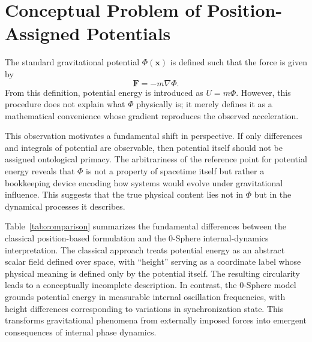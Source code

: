 \documentclass[%
 reprint,
 amsmath,amssymb,
 aps,
 prb,
]{revtex4-2}
\numberwithin{equation}{section}
\begin{document}
\section{Conceptual Problem of Position-Assigned Potentials}
\label{sec:conceptual_problem}

The standard gravitational potential $\Phi(\mathbf{x})$ is defined such that the force is given by
\begin{equation}
\mathbf{F} = - m \nabla \Phi.
\label{eq:force_potential}
\end{equation}
From this definition, potential energy is introduced as $U = m \Phi$. However, this procedure does not explain what $\Phi$ physically is; it merely defines it as a mathematical convenience whose gradient reproduces the observed acceleration.

This observation motivates a fundamental shift in perspective. If only differences and integrals of potential are observable, then potential itself should not be assigned ontological primacy. The arbitrariness of the reference point for potential energy reveals that $\Phi$ is not a property of spacetime itself but rather a bookkeeping device encoding how systems would evolve under gravitational influence. This suggests that the true physical content lies not in $\Phi$ but in the dynamical processes it describes.

Table~\ref{tab:comparison} summarizes the fundamental differences between the classical position-based formulation and the 0-Sphere internal-dynamics interpretation. The classical approach treats potential energy as an abstract scalar field defined over space, with ``height'' serving as a coordinate label whose physical meaning is defined only by the potential itself. The resulting circularity leads to a conceptually incomplete description. In contrast, the 0-Sphere model grounds potential energy in measurable internal oscillation frequencies, with height differences corresponding to variations in synchronization state. This transforms gravitational phenomena from externally imposed forces into emergent consequences of internal phase dynamics.
\end{document}
